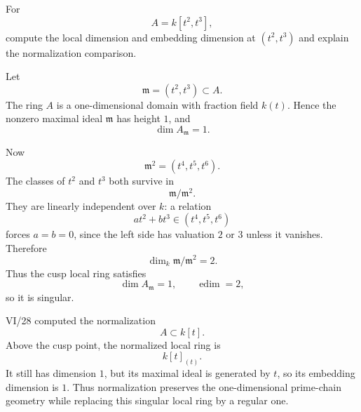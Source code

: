 \begin{problem}\label{prob:vi32-16}
For
\[
A=k[t^2,t^3],
\]
compute the local dimension and embedding dimension at \((t^2,t^3)\) and explain the normalization comparison.

\end{problem}

\ifdefined\FullProblemDossiers
\begin{solution}
Let
\[
\mathfrak m=(t^2,t^3)\subset A.
\]
The ring \(A\) is a one-dimensional domain with fraction field \(k(t)\). Hence the nonzero maximal ideal
\(\mathfrak m\) has height \(1\), and
\[
\dim A_{\mathfrak m}=1.
\]

Now
\[
\mathfrak m^2=(t^4,t^5,t^6).
\]
The classes of \(t^2\) and \(t^3\) both survive in
\[
\mathfrak m/\mathfrak m^2.
\]
They are linearly independent over \(k\): a relation
\[
a t^2+b t^3\in(t^4,t^5,t^6)
\]
forces \(a=b=0\), since the left side has valuation \(2\) or \(3\) unless it vanishes. Therefore
\[
\dim_k\mathfrak m/\mathfrak m^2=2.
\]
Thus the cusp local ring satisfies
\[
\boxed{\dim A_{\mathfrak m}=1,\qquad \operatorname{edim}=2},
\]
so it is singular.

VI/28 computed the normalization
\[
A\subset k[t].
\]
Above the cusp point, the normalized local ring is
\[
k[t]_{(t)}.
\]
It still has dimension \(1\), but its maximal ideal is generated by \(t\), so its embedding dimension is \(1\).
Thus normalization preserves the one-dimensional prime-chain geometry while replacing this singular local ring by
a regular one.
\end{solution}
\fi
